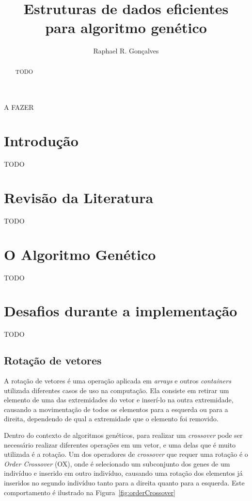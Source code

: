 \documentclass[12pt]{article}
\title{Estruturas de dados eficientes\\ para algoritmo gen\'{e}tico}
\author{Raphael R. Gon\c{c}alves\inst{1}}
\begin{document}
 

\maketitle

\begin{abstract}
    TODO
\end{abstract}
     
\begin{resumo} 
    A FAZER
\end{resumo}


\section{Introdu\c{c}\~{a}o}

TODO

\section{Revis\~{a}o da Literatura} \label{sec:firstpage}

TODO

\section{O Algoritmo Gen\'{e}tico}

TODO

\section{Desafios durante a implementa\c{c}\~{a}o}

TODO

\subsection{Rota\c{c}\~{a}o de vetores}

A rota\c{c}\~{a}o de vetores \'{e} uma opera\c{c}\~{a}o aplicada em \textit{arrays} e outros
\textit{containers} utilizada diferentes casos de uso na computa\c{c}\~{a}o.
Ela consiste em retirar um elemento de uma das extremidades do vetor e
inser\'{i}-lo na outra extremidade, causando a movimenta\c{c}\~{a}o de todos os elementos
para a esquerda ou para a direita, dependendo de qual a extremidade que o elemento
foi removido.

Dentro do contexto de algoritmos gen\'{e}ticos, para realizar um \textit{crossover} pode ser
necess\'{a}rio realizar diferentes opera\c{c}\~{o}es em um vetor, e uma delas que \'{e} muito
utilizada \'{e} a rota\c{c}\~{a}o. Um dos operadores de \textit{crossover} que requer uma
rota\c{c}\~{a}o \'{e} o \textit{Order Crossover} (OX), onde \'{e} selecionado um subconjunto dos genes
de um indiv\'{i}duo e inserido em outro indiv\'{i}duo, causando uma rota\c{c}\~{a}o dos elementos j\'{a}
inseridos no segundo indiv\'{i}duo tanto para a direita quanto para a esquerda. Este comportamento \'{e}
ilustrado na Figura~\ref{fig:orderCrossover}
\end{document}
